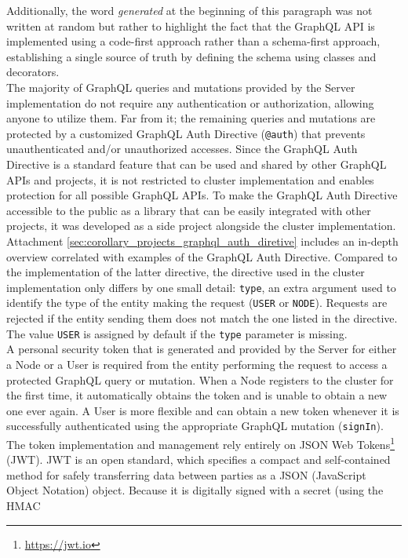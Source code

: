 Additionally, the word \textit{generated} at the beginning of this paragraph was
not written at random but rather to highlight the fact that the GraphQL API is
implemented using a code-first approach rather than a schema-first approach, establishing
a single source of truth by defining the schema using classes and decorators. \\ %
The majority of GraphQL queries and mutations provided by the Server implementation
do not require any authentication or authorization, allowing anyone to utilize
them. Far from it; the remaining queries and mutations are protected by a
customized GraphQL Auth Directive (\texttt{@auth}) that prevents unauthenticated
and/or unauthorized accesses. Since the GraphQL Auth Directive is a standard
feature that can be used and shared by other GraphQL APIs and projects, it is not
restricted to cluster implementation and enables protection for all possible GraphQL
APIs. To make the GraphQL Auth Directive accessible to the public as a library
that can be easily integrated with other projects, it was developed as a side project
alongside the cluster implementation. Attachment
\ref{sec:corollary_projects_graphql_auth_diretive} includes an in-depth overview
correlated with examples of the GraphQL Auth Directive. Compared to the implementation
of the latter directive, the directive used in the cluster implementation only
differs by one small detail: \texttt{type}, an extra argument used to identify the
type of the entity making the request (\texttt{USER} or \texttt{NODE}). Requests
are rejected if the entity sending them does not match the one listed in the
directive. The value \texttt{USER} is assigned by default if the \texttt{type} parameter
is missing. \\ %
A personal security token that is generated and provided by the Server for either
a Node or a User is required from the entity performing the request to access a protected
GraphQL query or mutation. When a Node registers to the cluster for the first
time, it automatically obtains the token and is unable to obtain a new one ever again.
A User is more flexible and can obtain a new token whenever it is successfully
authenticated using the appropriate GraphQL mutation (\texttt{signIn}). The
token implementation and management rely entirely on JSON Web Tokens\footnote{\url{https://jwt.io}}
(JWT). JWT is an open standard, which specifies a compact and self-contained
method for safely transferring data between parties as a JSON (JavaScript Object
Notation) object. Because it is digitally signed with a secret (using the HMAC

